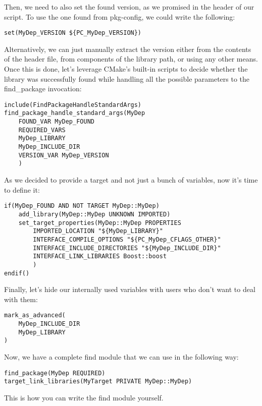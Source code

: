 Then, we need to also set the found version, as we promised in the header of our script. To use the one found from pkg-config, we could write the following:

\begin{lstlisting}[style=styleCMake]
set(MyDep_VERSION ${PC_MyDep_VERSION})
\end{lstlisting}

Alternatively, we can just manually extract the version either from the contents of the header file, from components of the library path, or using any other means. Once this is done, let's leverage CMake's built-in scripts to decide whether the library was successfully found while handling all the possible parameters to the find\_package invocation:

\begin{lstlisting}[style=styleCMake]
include(FindPackageHandleStandardArgs)
find_package_handle_standard_args(MyDep
	FOUND_VAR MyDep_FOUND
	REQUIRED_VARS
	MyDep_LIBRARY
	MyDep_INCLUDE_DIR
	VERSION_VAR MyDep_VERSION
	)
\end{lstlisting}

As we decided to provide a target and not just a bunch of variables, now it's time to define it:

\begin{lstlisting}[style=styleCMake]
if(MyDep_FOUND AND NOT TARGET MyDep::MyDep)
	add_library(MyDep::MyDep UNKNOWN IMPORTED)
	set_target_properties(MyDep::MyDep PROPERTIES
		IMPORTED_LOCATION "${MyDep_LIBRARY}"
		INTERFACE_COMPILE_OPTIONS "${PC_MyDep_CFLAGS_OTHER}"
		INTERFACE_INCLUDE_DIRECTORIES "${MyDep_INCLUDE_DIR}"
		INTERFACE_LINK_LIBRARIES Boost::boost
		)
endif()
\end{lstlisting}

Finally, let's hide our internally used variables with users who don't want to deal with them:

\begin{lstlisting}[style=styleCMake]
mark_as_advanced(
	MyDep_INCLUDE_DIR
	MyDep_LIBRARY
)
\end{lstlisting}

Now, we have a complete find module that we can use in the following way:

\begin{lstlisting}[style=styleCMake]
find_package(MyDep REQUIRED)
target_link_libraries(MyTarget PRIVATE MyDep::MyDep)
\end{lstlisting}

This is how you can write the find module yourself.

